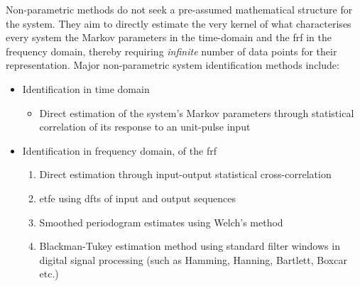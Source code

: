 Non-parametric methods do not seek  a pre-assumed mathematical structure for the
system. They  aim to  directly estimate  the very  kernel of  what characterises
every system \viz{}  the Markov parameters in the time-domain  and the \gls{frf}
in the frequency domain, thereby requiring \emph{infinite} number of data points
for  their representation.  Major non-parametric  system identification  methods
include:
\begin{itemize}[topsep=0pt]
    \item Identification in time domain
        \begin{itemize}

            \item Direct  estimation of the system's  Markov parameters through
                statistical correlation of its response to an unit-pulse input

        \end{itemize}
    \item Identification in frequency domain,  \ie{} of the \gls{frf}
        \begin{enumerate}

            \item   Direct   estimation    through   input-output   statistical
                cross-correlation

            \item  \gls{etfe} using \glspl{dft} of input and output sequences

            \item  Smoothed periodogram estimates using Welch's method

            \item  Blackman-Tukey  estimation   method  using  standard  filter
                windows  in digital  signal processing  (such as  Hamming, Hanning,
                Bartlett, Boxcar etc.)

        \end{enumerate}
\end{itemize}

